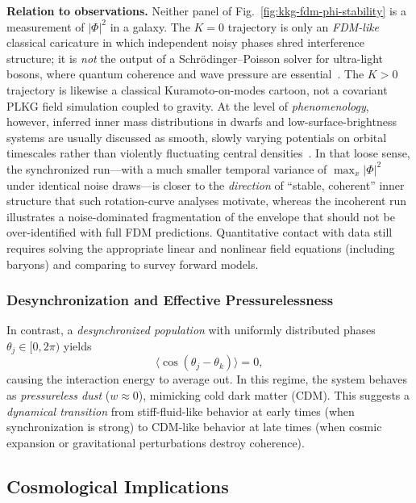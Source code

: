\textbf{Relation to observations.}
Neither panel of Fig.~\ref{fig:kkg-fdm-phi-stability} is a measurement of $|\Phi|^2$ in a galaxy.
The $K=0$ trajectory is only an \emph{FDM-like} classical caricature in which independent noisy phases shred interference structure; it is \emph{not} the output of a Schr\"odinger--Poisson solver for ultra-light bosons, where quantum coherence and wave pressure are essential~\cite{Hu2000,Marsh2016}.
The $K>0$ trajectory is likewise a classical Kuramoto-on-modes cartoon, not a covariant PLKG field simulation coupled to gravity.
At the level of \emph{phenomenology}, however, inferred inner mass distributions in dwarfs and low-surface-brightness systems are usually discussed as smooth, slowly varying potentials on orbital timescales rather than violently fluctuating central densities~\cite{Bullock2017}.
In that loose sense, the synchronized run---with a much smaller temporal variance of $\max_x|\Phi|^2$ under identical noise draws---is closer to the \emph{direction} of ``stable, coherent'' inner structure that such rotation-curve analyses motivate, whereas the incoherent run illustrates a noise-dominated fragmentation of the envelope that should not be over-identified with full FDM predictions.
Quantitative contact with data still requires solving the appropriate linear and nonlinear field equations (including baryons) and comparing to survey forward models.

\subsubsection{Desynchronization and Effective Pressurelessness}
\label{subsubsec:desync}
In contrast, a \emph{desynchronized population} with uniformly distributed phases $\theta_j \in [0, 2\pi)$ yields
\begin{equation}
\langle \cos(\theta_j - \theta_k) \rangle = 0,
\end{equation}
causing the interaction energy to average out. In this regime, the system behaves as \emph{pressureless dust} ($w \approx 0$), mimicking cold dark matter (CDM). This suggests a \emph{dynamical transition} from stiff-fluid-like behavior at early times (when synchronization is strong) to CDM-like behavior at late times (when cosmic expansion or gravitational perturbations destroy coherence).

\subsection{Cosmological Implications}
\label{subsec:cosmo_implications}

